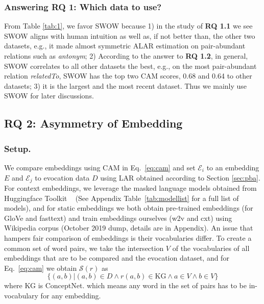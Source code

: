 \documentclass[letterpaper]{article} %
\begin{document}
\subsubsection{Answering RQ 1: Which data to use?} From Table \ref{tab:1}, we favor SWOW because 1) in the study of \textbf{RQ 1.1} we see SWOW aligns with human intuition as well as, if not better than, the other two datasets, e.g., it made almost symmetric ALAR estimation on pair-abundant relations such as  \textit{antonym}; 2) According to the answer to \textbf{RQ 1.2}, in general, SWOW correlates to all other datasets the best, e.g., on the most pair-abundant relation \textit{relatedTo}, SWOW has the top two CAM scores, 0.68 and 0.64 to other datasets; 3) it is the largest and the most recent dataset. Thus we mainly use SWOW for later discussions.




\subsection{\textbf{RQ 2}: Asymmetry of Embedding}
\subsubsection{Setup.} We compare embeddings using CAM in Eq.~\ref{eq:cam} and set $\mathcal{E}_i$ to an embedding $E$ and $\mathcal{E}_j$ to evocation data $D$ using LAR obtained according to Section \ref{sec:pba}. For context embeddings, we leverage the masked language models obtained from Huggingface Toolkit ~\citep{Wolf2019HuggingFacesTS} (See Appendix Table~\ref{tab:modellist} for a full list of models), and for static embeddings we both obtain pre-trained embeddings (for GloVe and fasttext) and train embeddings ourselves (w2v and cxt) using Wikipedia corpus (October 2019 dump, details are in Appendix). An issue that hampers fair comparison of embeddings is their vocabularies differ. To create a common set of word pairs, we take the intersection $V$ of the vocabularies of all embeddings that are to be compared and the evocation dataset, and for Eq.~\ref{eq:cam} we obtain $\mathcal{S}(r)$ as
\begin{equation}
\label{eq:common_pairs}
 \{(a,b) | (a,b) \in D \wedge r(a,b)\in \text{KG} \wedge a\in V \wedge b\in V\}
\end{equation}
where KG is ConceptNet. which means any word in the set of pairs has to be in-vocabulary for any embedding.
\end{document}
